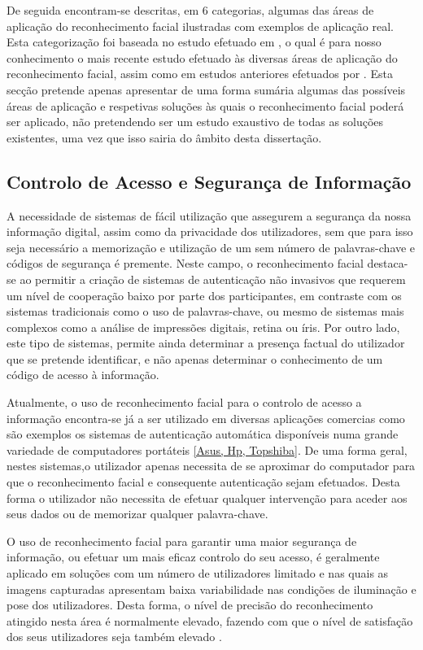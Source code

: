 De seguida encontram-se descritas, em 6 categorias, algumas das áreas de aplicação do reconhecimento facial ilustradas com exemplos de aplicação real. Esta categorização foi baseada no estudo efetuado em \cite{Li2011}, o qual é para nosso conhecimento o mais recente estudo efetuado às diversas áreas de aplicação do reconhecimento facial, assim como em estudos anteriores efetuados por \cite{Zhao2003}. Esta secção pretende apenas apresentar de uma forma sumária algumas das possíveis áreas de aplicação e respetivas soluções às quais o reconhecimento facial poderá ser aplicado, não pretendendo ser um estudo exaustivo de todas as soluções existentes, uma vez que isso sairia do âmbito desta dissertação.

\subsection{Controlo de Acesso e Segurança de Informação} \label{ControloAcesso}
A necessidade de sistemas de fácil utilização que assegurem a segurança da nossa informação digital, assim como da privacidade dos utilizadores, sem que para isso seja necessário a memorização e utilização de um sem número de palavras-chave e códigos de segurança é premente. Neste campo, o reconhecimento facial destaca-se ao permitir a criação de sistemas de autenticação não invasivos que requerem um nível de cooperação baixo por parte dos participantes, em contraste com os sistemas tradicionais como o uso de palavras-chave, ou mesmo de sistemas mais complexos como a análise de impressões digitais, retina ou íris. Por outro lado, este tipo de sistemas, permite ainda determinar a presença factual do utilizador que se pretende identificar, e não apenas determinar o conhecimento de um código de acesso à informação.

Atualmente, o uso de reconhecimento facial para o controlo de acesso a informação encontra-se já a ser utilizado em diversas aplicações comercias como são exemplos os sistemas de autenticação automática disponíveis numa grande variedade de computadores portáteis \ref{Asus, Hp, Topshiba}. De uma forma geral, nestes sistemas,o utilizador apenas necessita de se aproximar do computador para que o reconhecimento facial e consequente autenticação sejam efetuados. Desta forma o utilizador não necessita de efetuar qualquer intervenção para aceder aos seus dados ou de memorizar qualquer palavra-chave.

O uso de reconhecimento facial para garantir uma maior segurança de informação, ou efetuar um mais eficaz controlo do seu acesso, é geralmente aplicado em soluções com um número de utilizadores limitado e nas quais as imagens capturadas apresentam baixa variabilidade nas condições de iluminação e pose dos utilizadores. Desta forma, o nível de precisão do reconhecimento atingido nesta área é normalmente elevado, fazendo com que o nível de satisfação dos seus utilizadores seja também elevado \cite{Li2011}.

